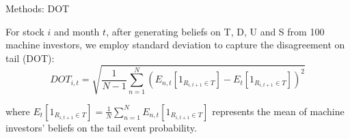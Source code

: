 \documentclass[11pt, aspectratio=169]{beamer}
\newenvironment{wideitemize}{\itemize\addtolength{\itemsep}{10pt}}{\enditemize}
\begin{document}
\begin{frame}{Methods: DOT}
\bigskip
\begin{wideitemize}
\item For stock $i$ and month $t$, after generating beliefs on T, D, U and S from 100 machine investors, we employ standard deviation to capture the \alert{disagreement on tail (DOT)}:
\begin{equation*}
  DOT_{i,t}=\sqrt{\frac{1}{N-1}\sum_{n=1}^{N}\left(E_{n,t}[1_{R_{i,t+1}\in T}]-E_t[1_{R_{i,t+1}\in T}]\right)^{2}}
\end{equation*}

where $E_t[1_{R_{i,t+1}\in T}] = \frac{1}{N}\sum_{n=1}^{N}E_{n,t}[1_{R_{i,t+1}\in T}]$ represents the mean of machine investors' beliefs on the tail event probability.

\end{wideitemize}
\end{frame}



\end{document}
